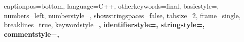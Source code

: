  {
    captionpos=bottom,
    language=C++,
    otherkeywords={final},
    basicstyle=\footnotesize,
    numbers=left,
    numberstyle=\small,
    showstringspaces=false,
    tabsize=2,
    frame=single,
    breaklines=true,
    keywordstyle=\bfseries\color[RGB]{127,0,85},
    identifierstyle=\color[RGB]{0,0,192},
    stringstyle=\color[RGB]{42,0,255},
    commentstyle=\color[RGB]{63,127,95},
}


\usepackage[ruled, vlined, linesnumbered]{algorithm2e}
\DontPrintSemicolon
{}

\usepackage[bookmarks=false]{hyperref}
\hypersetup{
    colorlinks,
    citecolor=black,
    filecolor=black,
    linkcolor=black,
    urlcolor=black
}
\def\chapterautorefname{Chapter}
\def\sectionautorefname{Section}
\def\subsectionautorefname{Subsection}
\def\algorithmautorefname{Algorithm}
\def\subfigureautorefname{Figure}


\usepackage[%
backend=bibtex				%
,style=numeric-comp		%
,sortcites=true				  %
,isbn=true
,url=true
,doi=true
]{biblatex}

